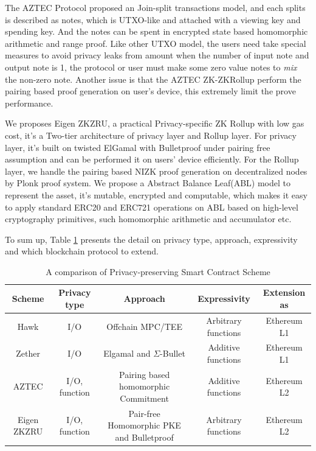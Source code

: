 \documentclass{article}
\begin{document}


The AZTEC Protocol \cite{williamson2018aztec} proposed an Join-split transactions model, and each splits is described as notes, which is UTXO-like and attached with a viewing key and spending key. And the notes can be spent in encrypted state based homomorphic arithmetic and range proof. Like other UTXO model, the users need take special measures to avoid privacy leaks from amount when the number of input note and output note is 1, the protocol or user must make some zero value notes to \textit{mix} the non-zero note. Another issue is that the AZTEC ZK-ZKRollup perform the pairing based proof generation on user's device, this extremely limit the prove performance. 

We proposes Eigen ZKZRU, a practical Privacy-specific ZK Rollup with low gas cost, it's a Two-tier architecture of privacy layer and Rollup layer. For privacy layer, it's built on twisted ElGamal with Bulletproof under pairing free assumption and can be performed it on users' device efficiently. For the Rollup layer, we handle the pairing based NIZK proof generation on decentralized nodes by Plonk proof system. We propose a Abstract Balance Leaf(ABL) model to represent the asset, it's mutable, encrypted and computable, which makes it easy to apply standard ERC20 and ERC721 operations on ABL based on high-level cryptography primitives, such homomorphic arithmetic and accumulator etc.

To sum up, Table \ref{tab:compare} presents the detail on privacy type, approach, expressivity and which blockchain protocol to extend.  

\begin{table}
\resizebox{\textwidth}{!} {
\begin{tabular}{c|c|c|c|c}
Scheme & Privacy type & Approach & Expressivity & Extension as \\\hline
Hawk & I/O & Offchain MPC/TEE & Arbitrary functions & Ethereum L1 \\
Zether & I/O & Elgamal and $\Sigma$-Bullet & Additive functions & Ethereum L1\\
AZTEC & I/O, function & Pairing based homomorphic Commitment & Additive functions & Ethereum L2\\
Eigen ZKZRU & I/O, function & Pair-free Homomorphic PKE and Bulletproof & Arbitrary functions & Ethereum L2
\end{tabular}
}
\caption{\label{tab:compare}A comparison of Privacy-preserving Smart Contract Scheme}
\end{table}
\end{document}
